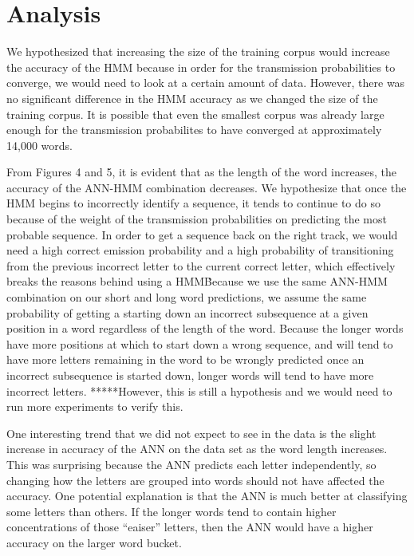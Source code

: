 \documentclass[11pt,a4paper,twocolumn]{article}
\begin{document}
\section{Analysis}

We hypothesized that increasing the size of the training corpus would increase the accuracy of the
HMM because in order for the transmission probabilities to converge, we would need to look at a
certain amount of data. However, there was no significant difference in the HMM accuracy as we
changed the size of the training corpus. It is possible that even the smallest corpus was already
large enough for the transmission probabilites to have converged at approximately 14,000 words.

From Figures 4 and 5, it is evident that as the length of the word increases, the accuracy of the
ANN-HMM combination decreases. We hypothesize that once the HMM begins to incorrectly identify a
sequence, it tends to continue to do so because of the weight of the transmission probabilities on
predicting the most probable sequence. In order to get a sequence back on the right track, we would
need a high correct emission probability and a high probability of transitioning from the previous
incorrect letter to the current correct letter, which effectively breaks the reasons behind using a
HMM\. Because we use the same ANN-HMM combination on our short and long word predictions, we assume
the same probability of getting a starting down an incorrect subsequence at a given position in a
word regardless of the length of the word. Because the longer words have more positions at which to
start down a wrong sequence, and will tend to have more letters remaining in the word to be wrongly
predicted once an incorrect subsequence is started down, longer words will tend to have more
incorrect letters. *****However, this is still a hypothesis and we would need to run more
experiments to verify this.

One interesting trend that we did not expect to see in the data is the slight increase in accuracy
of the ANN on the data set as the word length increases. This was surprising because the ANN
predicts each letter independently, so changing how the letters are grouped into words should not
have affected the accuracy. One potential explanation is that the ANN is much better at classifying
some letters than others. If the longer words tend to contain higher concentrations of those
``eaiser'' letters, then the ANN would have a higher accuracy on the larger word bucket. 
\end{document}
